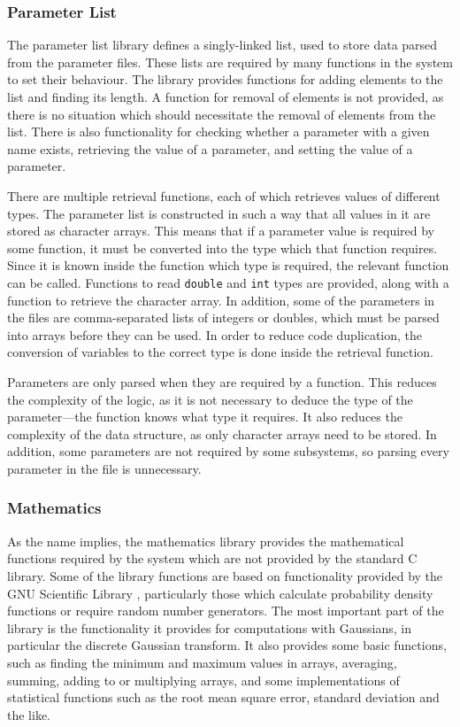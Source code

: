 \documentclass[a4paper,11pt,twoside]{article}
\begin{document}
\subsubsection{Parameter List}
\label{sec-6-3-1}

    The parameter list library defines a singly-linked list, used to store data
    parsed from the parameter files. These lists are required by many functions
    in the system to set their behaviour. The library provides functions for
    adding elements to the list and finding its length. A function for removal
    of elements is not provided, as there is no situation which should
    necessitate the removal of elements from the list. There is also
    functionality for checking whether a parameter with a given name exists,
    retrieving the value of a parameter, and setting the value of a parameter.

    There are multiple retrieval functions, each of which retrieves values of
    different types. The parameter list is constructed in such a way that all
    values in it are stored as character arrays. This means that if a parameter
    value is required by some function, it must be converted into the type which
    that function requires. Since it is known inside the function which type is
    required, the relevant function can be called. Functions to read
    \texttt{double} and \texttt{int} types are provided, along with a function
    to retrieve the character array. In addition, some of the parameters in the
    files are comma-separated lists of integers or doubles, which must be parsed
    into arrays before they can be used. In order to reduce code duplication,
    the conversion of variables to the correct type is done inside the retrieval
    function.

    Parameters are only parsed when they are required by a function. This
    reduces the complexity of the logic, as it is not necessary to deduce the
    type of the parameter---the function knows what type it requires. It also
    reduces the complexity of the data structure, as only character arrays need
    to be stored. In addition, some parameters are not required by some
    subsystems, so parsing every parameter in the file is unnecessary.
\subsubsection{Mathematics}
\label{sec-6-3-2}

    As the name implies, the mathematics library provides the mathematical
    functions required by the system which are not provided by the standard C
    library. Some of the library functions are based on functionality provided
    by the GNU Scientific Library \cite{gsl}, particularly those which calculate
    probability density functions or require random number generators. The most
    important part of the library is the functionality it provides for
    computations with Gaussians, in particular the discrete Gaussian
    transform. It also provides some basic functions, such as finding the
    minimum and maximum values in arrays, averaging, summing, adding to or
    multiplying arrays, and some implementations of statistical functions such
    as the root mean square error, standard deviation and the like.
\end{document}
